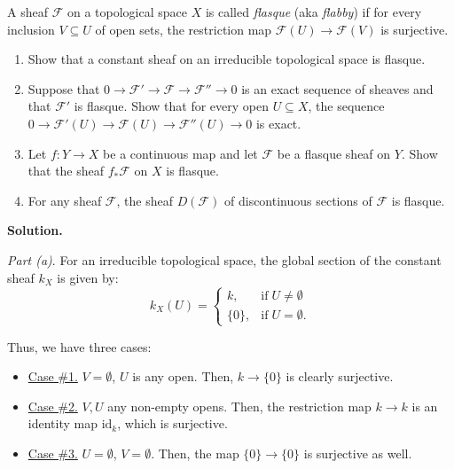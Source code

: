 \documentclass{template}
\begin{document}
\begin{problem}[Exercise 4]
    A sheaf $\mathcal{F}$ on a topological space $X$ is called \textit{flasque} (aka \textit{flabby}) if 
    for every inclusion $V \subseteq U$ of open sets, the restriction map $\mathcal{F}(U) \to \mathcal{F}(V)$
    is surjective.
    \begin{enumerate}
        \item[(a)] Show that a constant sheaf on an irreducible topological space is flasque.
        \item[(b)] Suppose that $0 \to \mathcal{F}' \to \mathcal{F} \to \mathcal{F}'' \to 0$ is an exact sequence 
        of sheaves and that $\mathcal{F}'$ is flasque. Show that for every open $U \subseteq X$, the sequence $0 \to \mathcal{F}'(U) \to \mathcal{F}(U) \to \mathcal{F}''(U) \to 0$ is exact.
        \item[(c)] Let $f: Y \to X$ be a continuous map and let $\mathcal{F}$ be a flasque sheaf on $Y$. Show that the sheaf $f_*\mathcal{F}$ on $X$ is flasque.
        \item[(d)] For any sheaf $\mathcal{F}$, the sheaf $D(\mathcal{F})$ of discontinuous sections of $\mathcal{F}$ is flasque. 
    \end{enumerate}
\end{problem}

\textbf{Solution.}

\textcolor{blue!70!black}{\textit{Part (a)}}. For an irreducible topological 
space, the global section of the constant sheaf $k_X$ is given by:
\begin{equation*}
    k_X(U) = \begin{cases}
        k, & \text{if} \; U \neq \emptyset \\
        \{0\}, & \text{if} \; U = \emptyset.
    \end{cases}
\end{equation*}

Thus, we have three cases:
\begin{itemize}
    \item \underline{Case \#1.} $V=\emptyset$, $U$ is any open. Then, $k \to \{0\}$ is clearly surjective.
    \item \underline{Case \#2.} $V,U$ any non-empty opens. Then, the restriction map $k \to k$ is an identity map $\text{id}_k$, which is surjective.
    \item \underline{Case \#3.} $U=\emptyset$, $V=\emptyset$. Then, the map $\{0\} \to \{0\}$ is surjective as well.
\end{itemize}
\end{document}
